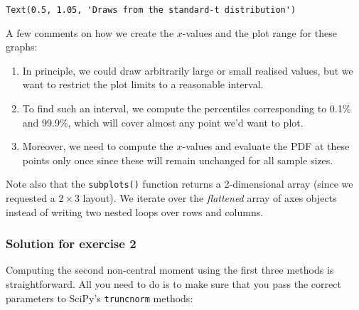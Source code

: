\documentclass{scrartcl}
\makeatletter
\providecommand{\tightlist}{%
      \setlength{\itemsep}{0pt}\setlength{\parskip}{0pt}}
\newcommand{\boxspacing}{\kern\kvtcb@left@rule\kern\kvtcb@boxsep}
\newcommand{\prompt}[4]{
        {\ttfamily\llap{{\color{#2}[#3]:\hspace{3pt}#4}}\vspace{-\baselineskip}}
    }
\makeatother
\begin{document}
            \begin{tcolorbox}[breakable, size=fbox, boxrule=.5pt, pad at break*=1mm, opacityfill=0]
\prompt{Out}{outcolor}{21}{\boxspacing}
\begin{Verbatim}[commandchars=\\\{\}]
Text(0.5, 1.05, 'Draws from the standard-t distribution')
\end{Verbatim}
\end{tcolorbox}
        
    \begin{center}
    \end{center}
    
    A few comments on how we create the \(x\)-values and the plot range for
these graphs:

\begin{enumerate}
\def\labelenumi{\arabic{enumi}.}
\tightlist
\item
  In principle, we could draw arbitrarily large or small realised
  values, but we want to restrict the plot limits to a reasonable
  interval.
\item
  To find such an interval, we compute the percentiles corresponding to
  0.1\% and 99.9\%, which will cover almost any point we'd want to plot.
\item
  Moreover, we need to compute the \(x\)-values and evaluate the PDF at
  these points only once since these will remain unchanged for all
  sample sizes.
\end{enumerate}

Note also that the \texttt{subplots()} function returns a 2-dimensional
array (since we requested a \(2 \times 3\) layout). We iterate over the
\emph{flattened} array of axes objects instead of writing two nested
loops over rows and columns.

    \hypertarget{solution-for-exercise-2}{%
\subsubsection{Solution for exercise 2}\label{solution-for-exercise-2}}

Computing the second non-central moment using the first three methods is
straightforward. All you need to do is to make sure that you pass the
correct parameters to SciPy's \texttt{truncnorm} methods:
\end{document}
